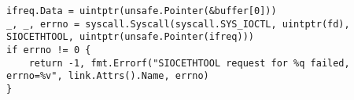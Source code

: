 \begin{lstlisting}[language=Golang, label=lst:labels-classexample-syscall, caption=Usage class example: syscall]
ifreq.Data = uintptr(unsafe.Pointer(&buffer[0]))
_, _, errno = syscall.Syscall(syscall.SYS_IOCTL, uintptr(fd), SIOCETHTOOL, uintptr(unsafe.Pointer(ifreq)))
if errno != 0 {
    return -1, fmt.Errorf("SIOCETHTOOL request for %q failed, errno=%v", link.Attrs().Name, errno)
}
\end{lstlisting}